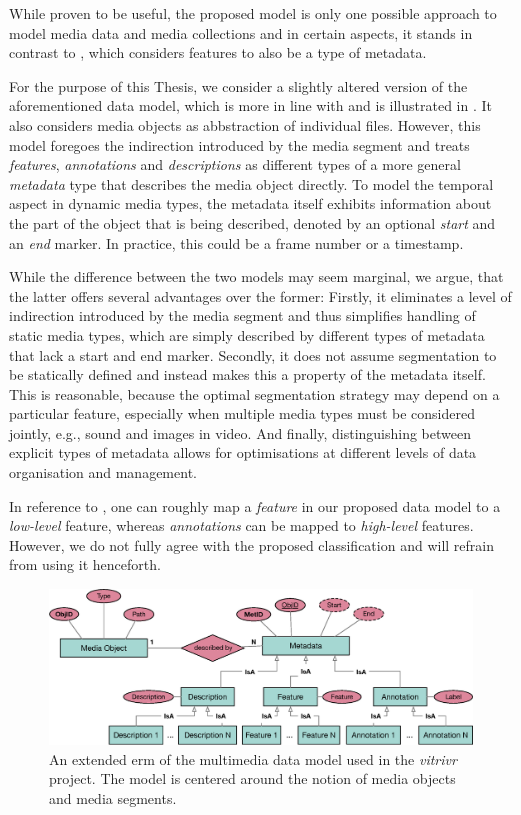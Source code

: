 While proven to be useful, the proposed model is only one possible approach to model media data and media collections and in  certain aspects, it stands in contrast to \cite{Blanken:2007multimedia}, which considers features to also be a type of metadata. 

For the purpose of this Thesis, we consider a slightly altered version of the aforementioned data model, which is more in line with \cite{Blanken:2007multimedia} and is illustrated in . It also considers media objects as abbstraction of individual files. However, this model foregoes the indirection introduced by the media segment and treats \emph{features}, \emph{annotations} and \emph{descriptions} as different types of a more general \emph{metadata} type that describes the media object directly. To model the temporal aspect in dynamic media types, the metadata itself exhibits information about the part of the object that is being described, denoted by an optional \emph{start} and an \emph{end} marker. In practice, this could be a frame number or a timestamp. 

While the difference between the two models may seem marginal, we argue, that the latter offers several advantages over the former: Firstly, it eliminates a level of indirection introduced by the media segment and thus simplifies handling of static media types, which are simply described by different types of metadata that lack a start and end marker. Secondly, it does not assume segmentation to be statically defined and instead makes this a property of the metadata itself. This is reasonable, because the optimal segmentation strategy may depend on a particular feature, especially when multiple media types must be considered jointly, e.g., sound and images in video. And finally, distinguishing between explicit types of metadata allows for optimisations at different levels of data organisation and management.

In reference to \cite{Blanken:2007multimedia}, one can roughly map a \emph{feature} in our proposed data model to a \emph{low-level} feature, whereas \emph{annotations} can be mapped to \emph{high-level} features. However, we do not fully agree with the proposed classification and will refrain from using it henceforth. 

\begin{figure}[bt]
    \centering
    \includegraphics[width=\textwidth]{figures/erm-media-data}
    \caption{An extended \acrshort{erm} of the multimedia data model used in the \emph{vitrivr} project. The model is centered around the notion of media objects and media segments.}
    \label{figure:erm_mediadata}
\end{figure}

